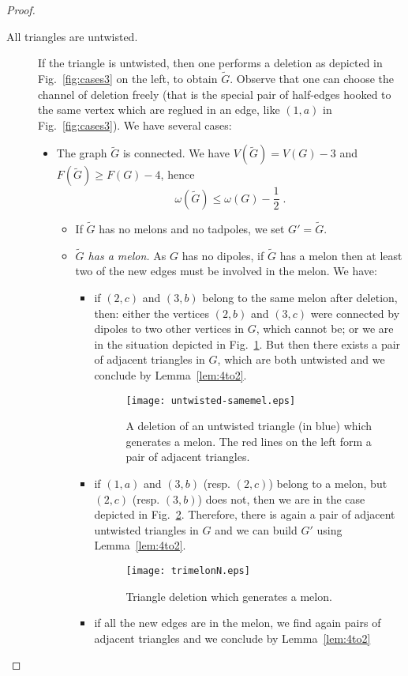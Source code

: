 \documentclass[10pt]{article}
\theoremstyle{plain}
\theoremstyle{definition}
\begin{document}
\begin{proof}
\begin{description}
\item[All triangles are untwisted.] If the triangle is untwisted, then one performs a deletion as depicted in Fig.~\ref{fig:cases3} on the left, to obtain $\tilde{G}$. 
Observe that one can choose the channel of deletion freely (that is the special pair of half-edges hooked to the same vertex which are reglued in an edge, like $(1,a)$ in Fig.~\ref{fig:cases3}). We have several cases:
\begin{itemize}
 \item The graph $\tilde{G}$ is connected. We have $V(\tilde{G}) = V(G)-3$ and $F(\tilde{G}) \ge F(G)- 4$, hence
    \[
     \omega( \tilde G) \le \omega(G) -\frac{1}{2} \;.
    \]
    
   \begin{itemize}  
	\item If $\tilde{G}$ has no melons and no tadpoles, we set $G'=\tilde{G}$.   
   \item {\it $\tilde{G}$ has a melon.} As $G$ has no dipoles, if $\tilde G$ has a melon then at least two of the new edges must be involved in the melon. 
       We have:
       \begin{itemize}
        \item if $(2,c)$ and $(3,b)$ belong to the same melon after deletion, then: either the vertices $(2,b)$ and $(3,c)$ were connected by dipoles to two other vertices in $G$, which cannot be; or we are in the situation 
        depicted in Fig.~\ref{fig:untwisted-samemel}. But then there exists a pair of adjacent triangles in $G$, which are both untwisted and we conclude by Lemma~\ref{lem:4to2}.

\begin{figure}[htb]
 \begin{center}
 \texttt{[image: untwisted-samemel.eps]}  
 \caption{A deletion of an untwisted triangle (in blue) which generates a melon. The red lines on the left form a pair of adjacent triangles.} \label{fig:untwisted-samemel}
 \end{center}
 \end{figure}  
        \item if $(1,a)$ and $(3,b)$ (resp. $(2,c)$) belong to a melon, but $(2,c)$ (resp. $(3,b)$) does not, then we are in the case depicted in Fig.~\ref{fig:trimelon}. Therefore, there is again a pair of adjacent untwisted
        triangles in $G$ and we can build $G'$ using Lemma~\ref{lem:4to2}. 
        \begin{figure}[htb]
 \begin{center}
 \texttt{[image: trimelonN.eps]}  
 \caption{Triangle deletion which generates a melon.} \label{fig:trimelon}
 \end{center}
 \end{figure}  
  \item if all the new edges are in the melon, we find again pairs of adjacent triangles and we conclude by Lemma~\ref{lem:4to2}
\end{itemize}
   

\end{itemize}
\end{itemize}
\end{description}
\end{proof}
\end{document}
